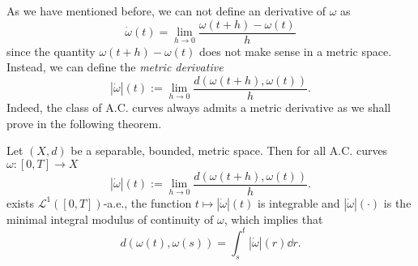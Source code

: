 As we have mentioned before, we can not define an derivative of $\omega$ as 
\begin{equation}
\dot{\omega}(t) = \lim_{h \to 0} \frac{\omega(t+h) - \omega(t)}{h}
\end{equation}
since the quantity $\omega(t+h) - \omega(t)$ does not make sense in a metric space. Instead, we can define the {\em metric derivative}
\begin{equation}
\label{metric_derivative}
|\dot{\omega}|(t) := \lim_{h \to 0} \frac{d(\omega(t+h), \omega(t))}{h}.
\end{equation}
Indeed, the class of A.C. curves always admits a metric derivative as we shall prove in the following theorem. 

\begin{theorem}
	\label{theorem.AC_metric_derivative}
	Let $(X,d)$ be a separable, bounded, metric space. Then for all A.C. curves $\omega :[0,T] \to X$
	\begin{equation*}
	|\dot{\omega}|(t) := \lim_{h \to 0} \frac{d(\omega(t+h), \omega(t))}{h}.
	\end{equation*}
	exists $\mathcal{L}^1([0,T])$-a.e., the function $t \mapsto |\dot{\omega}|(t)$ is integrable and $|\dot{\omega}|(\cdot)$ is the minimal integral modulus of continuity of $\omega$, which implies that 
	\begin{equation}
	d(\omega(t),\omega(s)) = \int_s^t |\dot{\omega}|(r)\dd r.
	\end{equation} 
\end{theorem}
